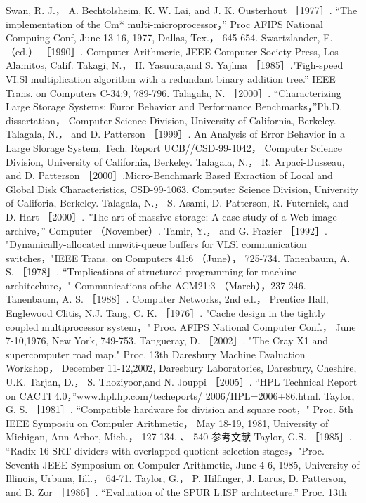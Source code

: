 Swan, R. J.， A. Bechtolsheim, K. W. Lai, and J. K. Ousterhout ［1977］. “The implementation of the Cm* multi-microprocessor，”
Proc AFIPS National Compuing Conf, June 13-16, 1977, Dallas, Tex.， 645-654.
Swartzlander, E. （ed.） ［1990］. Computer Arithmeric, JEEE Computer Society Press, Los Alamitos, Calif.
Takagi, N.， H. Yasuura,and S. Yajlma ［1985］."Figh-speed VI.Sl multiplication algoritbm with a redundant binary addition tree.”
IEEE Trans. on Computers C-34:9, 789-796.
Talagala, N. ［2000］. “Characterizing Large Storage Systems: Euror Behavior and Performance Benchmarks，”Ph.D. dissertation，
Computer Science Division, University of California, Berkeley.
Talagala, N.， and D. Patterson ［1999］. An Analysis of Error Behavior in a Large Slorage System, Tech. Report UCB//CSD-99-1042，
Computer Science Division, University of California, Berkeley.
Talagala, N.， R. Arpaci-Dusseau, and D. Patterson ［2000］.Micro-Benchmark Based Exraction of Local and Global Disk
Characteristics, CSD-99-1063, Computer Science Division, University of Califoria, Berkeley.
Talagala, N.， S. Asami, D. Patterson, R. Futernick, and D. Hart ［2000］. "The art of massive storage: A case study of a Web image
archive，” Computer （November）.
Tamir, Y.， and G. Frazier ［1992］. "Dynamically-allocated mnwiti-queue buffers for VLSl communication switches，"IEEE Trans.
on Computers 41:6 （June）， 725-734.
Tanenbaum, A. S. ［1978］. “Tmplications of structured programming for machine architechure，" Communications ofthe ACM21:3
（March），237-246.
Tanenbaum, A. S. ［1988］. Computer Networks, 2nd ed.， Prentice Hall, Englewood Clitis, N.J.
Tang, C. K. ［1976］. "Cache design in the tightly coupled multiprocessor system，" Proc. AFIPS National Computer Conf.， June
7-10,1976, New York, 749-753.
Tangueray, D. ［2002］. "The Cray X1 and supercomputer road map." Proc. 13th Daresbury Machine Evaluation Workshop，
December 11-12,2002, Daresbury Laboratories, Daresbury, Cheshire, U.K.
Tarjan, D.， S. Thoziyoor,and N. Jouppi ［2005］. “HPL Technical Report on CACTI 4.0，”www.hpl.hp.com/techeports/
2006/HPL=2006+86.html.
Taylor, G. S. ［1981］. “Compatible hardware for division and square root，" Proc. 5th IEEE Symposiu on Compuler Arithmetic，
May 18-19, 1981, University of Michigan, Ann Arbor, Mich.， 127-134.
、
540
参考文献
Taylor, G.S. ［1985］. “Radix 16 SRT dividers with overlapped quotient selection stages，"Proc. Seventh JEEE Symposium on
Compuler Arithmetie, June 4-6, 1985, University of Illinois, Urbana, Iill.， 64-71.
Taylor, G.， P. Hilfinger, J. Larus, D. Patterson, and B. Zor ［1986］. “Evaluation of the SPUR L.ISP architecture.” Proc. 13th
